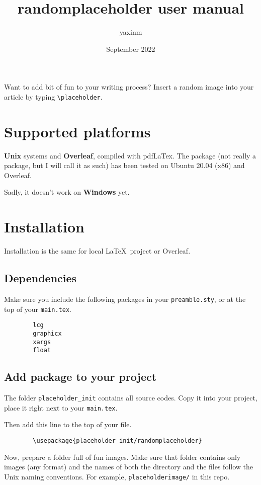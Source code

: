 \documentclass[12pt]{article}
\title{randomplaceholder user manual}
\author{yaxinm}
\date{September 2022}
\begin{document}
    Want to add bit of fun to your writing process?
    Insert a random image into your article by typing \lstinline{\placeholder}. 
    \section{Supported platforms}
    \textbf{Unix} systems and \textbf{Overleaf}, compiled with pdfLaTex. 
    The package (not really a package, but I will call it as such) 
    has been tested on Ubuntu 20.04 (x86) and Overleaf.

    Sadly, it doesn't work on \textbf{Windows} yet.

    \section{Installation}
    Installation is the same for local \LaTeX~project or Overleaf.

    \subsection{Dependencies}
    Make sure you include the following packages in your \lstinline{preamble.sty}, or at the top of your \lstinline{main.tex}.
    \begin{lstlisting}
        lcg
        graphicx
        xargs
        float
    \end{lstlisting}

    \subsection{Add package to your project}
    The folder \lstinline{placeholder_init} contains all source codes.
    Copy it into your project, place it right next to your \lstinline{main.tex}. 
    
    Then add this line to the top of your file.
    \begin{lstlisting}
        \usepackage{placeholder_init/randomplaceholder}
    \end{lstlisting}

    Now, prepare a folder full of fun images. Make sure that folder contains only images (any format) and the names of both the directory and the files follow the Unix naming conventions. For example, \lstinline{placeholderimage/} in this repo.
\end{document}
